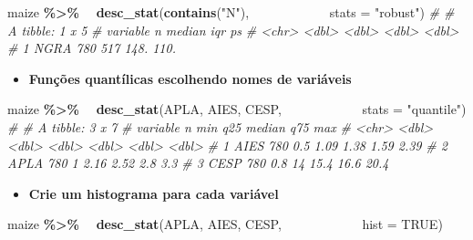 \documentclass[
]{book}
\newenvironment{Shaded}{\begin{snugshade}}{\end{snugshade}}
\newcommand{\CommentTok}[1]{\textcolor[rgb]{0.56,0.35,0.01}{\textit{#1}}}
\newcommand{\DataTypeTok}[1]{\textcolor[rgb]{0.13,0.29,0.53}{#1}}
\newcommand{\KeywordTok}[1]{\textcolor[rgb]{0.13,0.29,0.53}{\textbf{#1}}}
\newcommand{\NormalTok}[1]{#1}
\newcommand{\OperatorTok}[1]{\textcolor[rgb]{0.81,0.36,0.00}{\textbf{#1}}}
\newcommand{\OtherTok}[1]{\textcolor[rgb]{0.56,0.35,0.01}{#1}}
\newcommand{\StringTok}[1]{\textcolor[rgb]{0.31,0.60,0.02}{#1}}
\providecommand{\tightlist}{%
  \setlength{\itemsep}{0pt}\setlength{\parskip}{0pt}}
\numberwithin{equation}{section}
\begin{document}
\begin{Shaded}
\begin{Highlighting}[]
\NormalTok{maize }\OperatorTok{\%\textgreater{}\%}
  \KeywordTok{desc\_stat}\NormalTok{(}\KeywordTok{contains}\NormalTok{(}\StringTok{"N"}\NormalTok{),}
            \DataTypeTok{stats =} \StringTok{"robust"}\NormalTok{)}
\CommentTok{\# \# A tibble: 1 x 5}
\CommentTok{\#   variable     n median   iqr    ps}
\CommentTok{\#   \textless{}chr\textgreater{}    \textless{}dbl\textgreater{}  \textless{}dbl\textgreater{} \textless{}dbl\textgreater{} \textless{}dbl\textgreater{}}
\CommentTok{\# 1 NGRA       780    517  148.  110.}
\end{Highlighting}
\end{Shaded}

\begin{itemize}
\tightlist
\item
  \textbf{Funções quantílicas escolhendo nomes de variáveis}
\end{itemize}

\begin{Shaded}
\begin{Highlighting}[]
\NormalTok{maize }\OperatorTok{\%\textgreater{}\%}
  \KeywordTok{desc\_stat}\NormalTok{(APLA, AIES, CESP,}
            \DataTypeTok{stats =} \StringTok{"quantile"}\NormalTok{)}
\CommentTok{\# \# A tibble: 3 x 7}
\CommentTok{\#   variable     n   min   q25 median   q75   max}
\CommentTok{\#   \textless{}chr\textgreater{}    \textless{}dbl\textgreater{} \textless{}dbl\textgreater{} \textless{}dbl\textgreater{}  \textless{}dbl\textgreater{} \textless{}dbl\textgreater{} \textless{}dbl\textgreater{}}
\CommentTok{\# 1 AIES       780   0.5  1.09   1.38  1.59  2.39}
\CommentTok{\# 2 APLA       780   1    2.16   2.52  2.8   3.3 }
\CommentTok{\# 3 CESP       780   0.8 14     15.4  16.6  20.4}
\end{Highlighting}
\end{Shaded}

\begin{itemize}
\tightlist
\item
  \textbf{Crie um histograma para cada variável}
\end{itemize}

\begin{Shaded}
\begin{Highlighting}[]
\NormalTok{maize }\OperatorTok{\%\textgreater{}\%}
  \KeywordTok{desc\_stat}\NormalTok{(APLA, AIES, CESP,}
            \DataTypeTok{hist =} \OtherTok{TRUE}\NormalTok{)}
\end{Highlighting}
\end{Shaded}
\end{document}
